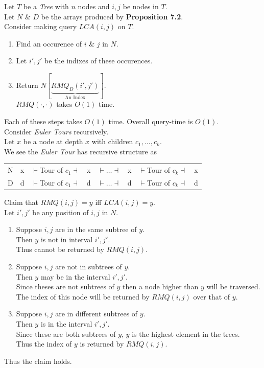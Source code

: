\documentclass[11pt,a4paper]{article}
\begin{document}
Let $T$ be a \textit{Tree} with $n$ nodes and $i,j$ be nodes in $T$.\\
Let $N$ \& $D$ be the arrays produced by \textbf{Proposition 7.2}.\\
Consider making query $LCA(i,j)$ on $T$.
\begin{enumerate}
	\item Find an occurence of $i$ \& $j$ in $N$.
	\item Let $i',j'$ be the indixes of these occurences.
	\item Return $N[\underbrace{RMQ_D(i',j')}_\text{An Index}]$.\\
	\nb $RMQ(\cdot,\cdot)$ takes $O(1)$ time.
\end{enumerate}
Each of these steps takes $O(1)$ time. Overall query-time is $O(1)$.\\

Consider \textit{Euler Tours} recursively.\\
Let $x$ be a node at depth $x$ with children $c_1,\dots,c_k$.\\
We see the \textit{Euler Tour} has recursive structure as
\begin{center}
\begin{tabular}{c|c|c|c|c|c|c|c|}
\cline{2-8}
N&x&$\vdash$Tour of $c_1\dashv$&x&$\vdash\dots\dashv$&x&$\vdash$Tour of $c_k\dashv$&x\\
\cline{2-8}
D&d&$\vdash$Tour of $c_1\dashv$&d&$\vdash\dots\dashv$&d&$\vdash$Tour of $c_k\dashv$&d\\
\cline{2-8}
\end{tabular}
\end{center}
Claim that $RMQ(i,j)=y$ iff $LCA(i,j)=y$.\\
Let $i',j'$ be any position of $i,j$ in $N$.
\begin{enumerate}
	\item Suppose $i,j$ are in the same subtree of $y$.\\
	Then $y$ is not in interval $i',j'$.\\
	Thus cannot be returned by $RMQ(i,j)$.
	\item Suppose $i,j$ are not in subtrees of $y$.\\
	Then $y$ may be in the interval $i',j'$.\\
	Since theses are not subtrees of $y$ then a node higher than $y$ will be traversed.\\
	The index of this node will be returned by $RMQ(i,j)$ over that of $y$.
	\item Suppose $i,j$ are in different subtrees of $y$.\\
	Then $y$ is in the interval $i',j'$.\\
	Since these are both subtrees of $y$, $y$ is the highest element in the trees.\\
	Thus the index of $y$ is returned by $RMQ(i,j)$.
\end{enumerate}
Thus the claim holds.\proved
\end{document}
